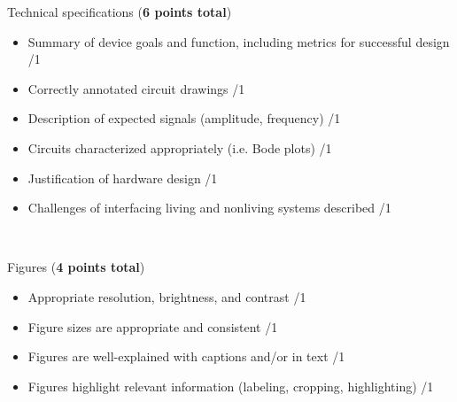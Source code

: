 \documentclass{article}
\begin{document}
Technical specifications (\textbf{6 points total})
\begin{small}
\begin{itemize}
	\item Summary of device goals and function, including metrics for successful design \hfill \underline{\hspace{1cm}}/1
	\item Correctly annotated circuit drawings \hfill \underline{\hspace{1cm}}/1
	\item Description of expected signals (amplitude, frequency) \hfill \underline{\hspace{1cm}}/1
	\item Circuits characterized appropriately (i.e. Bode plots) \hfill \underline{\hspace{1cm}}/1
	\item Justification of hardware design \hfill \underline{\hspace{1cm}}/1
	\item Challenges of interfacing living and nonliving systems described \hfill \underline{\hspace{1cm}}/1
\end{itemize}
\end{small}\

Figures (\textbf{4 points total})
\begin{small}
\begin{itemize}
	\item Appropriate resolution, brightness, and contrast \hfill \underline{\hspace{1cm}}/1
	\item Figure sizes are appropriate and consistent \hfill \underline{\hspace{1cm}}/1
	\item Figures are well-explained with captions and/or in text \hfill \underline{\hspace{1cm}}/1
	\item Figures highlight relevant information (labeling, cropping, highlighting) \hfill \underline{\hspace{1cm}}/1
\end{itemize}
\end{small}\
\end{document}

